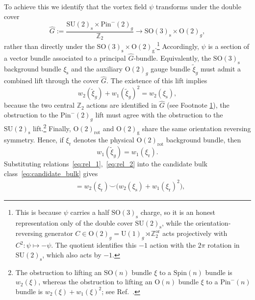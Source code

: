 \documentclass[aps,prx,reprint,superscriptaddress,twocolumn,amsmath,amssymb,amsfonts, nofootinbib]{revtex4-2}
\newcommand{\Z}{\mathbb{Z}}
\theoremstyle{apsstyle}
\begin{document}
To achieve this we identify that the vortex field $\psi$ transforms under the double cover
\begin{equation*}
    \widehat G :=\frac{\mathrm{SU}(2)_{\mathrm{s}}\times \mathrm{Pin}^{-}(2)_{g}}{\mathbb Z_{2}} \longrightarrow
    \mathrm{SO}(3)_{\mathrm{s}}\times \mathrm{O}(2)_{g},
\end{equation*}
rather than directly under the $\mathrm{SO}(3)_{\mathrm{s}}\times \mathrm{O}(2)_{\mathrm{g}}$.\footnote{\label{note:doublecover}This is because $\psi$ carries a half $\mathrm{SO}(3)_{\mathrm{s}}$ charge, so it is an honest representation only of the double cover $\mathrm{SU}(2)_{\mathrm{s}}$, while the orientation-reversing generator $C\in \mathrm{O}(2)_{g}=\mathrm{U(1)}_{g}\rtimes \Z_{2}^{\mathrm{or}}$ acts projectively with $C^{2}:\psi\mapsto -\psi$. The quotient identifies this $-1$ action with the $2\pi$ rotation in $\mathrm{SU}(2)_{\mathrm{s}}$, which also acts by $-1$.}
Accordingly, $\psi$ is a section of a vector bundle associated to a principal $\widehat G$-bundle. Equivalently, the $\mathrm{SO}(3)_{\mathrm{s}}$ background bundle $\xi_{\mathrm{s}}$ and the auxiliary $\mathrm{O}(2)_{g}$ gauge bundle $\widetilde{\xi}_{g}$ must admit a combined lift through the cover $\widehat G$. The existence of this lift implies
\begin{equation}
    w_{2}(\widetilde{\xi}_{g}) + w_{1}(\widetilde{\xi}_{g})^{2}
    = w_{2}(\xi_{\mathrm{s}}),
    \label{eq:rel_1}
\end{equation}
because the two central $\mathbb Z_{2}$ actions are identified in $\widehat G$ (see Footnote \ref{note:doublecover}), the obstruction to the $\mathrm{Pin}^{-}(2)_{g}$ lift must agree with the obstruction to the $\mathrm{SU}(2)_{\mathrm{s}}$ lift.\footnote{The obstruction to lifting an $\mathrm{SO}(n)$ bundle $\xi$ to a $\mathrm{Spin}(n)$ bundle is $w_{2}(\xi)$, whereas the obstruction to lifting an $\mathrm{O}(n)$ bundle $\xi$ to a $\mathrm{Pin}^{-}(n)$ bundle is $w_{2}(\xi)+w_{1}(\xi)^{2}$; see Ref.~\cite{Kirby1991}.} Finally, $\mathrm{O}(2)_{\mathrm{rot}}$ and $\mathrm{O}(2)_{\mathrm{g}}$ share the same orientation reversing symmetry. Hence, if $\xi_{\mathrm{r}}$ denotes
the physical $\mathrm{O}(2)_{\mathrm{rot}}$ background bundle, then
\begin{equation}
    w_{1}(\widetilde{\xi}_{g}) = w_{1}(\xi_{\mathrm{r}}).
    \label{eq:rel_2}
\end{equation}
Substituting relations~\eqref{eq:rel_1},~\eqref{eq:rel_2} into the candidate bulk class~\eqref{eq:candidate_bulk} gives
\begin{align}
    [x_{\mathrm{bulk}}]
    &= w_{2}(\xi_{\mathrm{r}})\smile\bigl(w_{2}(\xi_{\mathrm{s}})+w_{1}(\xi_{\mathrm{r}})^{2}\bigr),
    \label{eq:afm_vbs_class}
\end{align}
\end{document}
